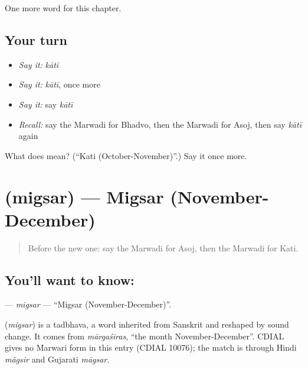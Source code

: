 \begin{grammarlens}[title={What you've built}]
One more word for this chapter.
\end{grammarlens}

\subsection*{Your turn}
\begin{itemize}
\raggedright
  \item \emph{Say it:} \emph{kātī}
  \item \emph{Say it:} \emph{kātī}, once more
  \item \emph{Say it:} say \emph{kātī}
  \item \emph{Recall:} say the Marwadi for Bhadvo, then the Marwadi for Asoj, then say \emph{kātī} again
\end{itemize}

\begin{tcolorbox}[breakable,colback=teal!4,colframe=teal!35!black,title={Before you move on}]
What does  mean? (\textquotedblleft{}Kati (October-November)\textquotedblright{}.) Say it once more.
\end{tcolorbox}
\section[\texorpdfstring{\mw{मिगसर} (migsar)}{मिगसर (migsar)}]{ (migsar) — Migsar (November-December)}

\label{lesson:MW-C93-migsar}



\begin{quote}
Before the new one: say the Marwadi for Asoj, then the Marwadi for Kati.
\end{quote}

\subsection*{You'll want to know: }
\textbf{} — \emph{migsar} — \textquotedblleft{}Migsar (November-December)\textquotedblright{}.

\begin{cousinweb}
\textbf{} (\emph{migsar}) is a tadbhava, a word inherited from Sanskrit and reshaped by sound change. It comes from \emph{mārgaśiras}, \textquotedblleft{}the month November-December\textquotedblright{}. CDIAL gives no Marwari form in this entry (CDIAL 10076); the match is through Hindi \emph{mãgsir} and Gujarati \emph{māgsar}.
\end{cousinweb}


